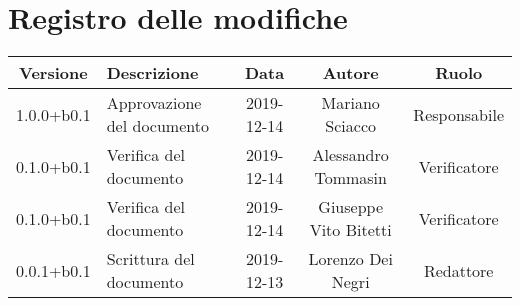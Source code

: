 \section*{Registro delle modifiche}

\begin{center}
	\begin{longtable}{|c|p{3cm}|c|c|c|}
	\hline
	\rowcolor{lighter-grayer}
	\textbf{Versione} & \textbf{Descrizione} & \textbf{Data} & \textbf{Autore} & \textbf{Ruolo} \\
	\hline
	\endfirsthead



	1.0.0+b0.1 & Approvazione del documento & 2019-12-14 & Mariano Sciacco & Responsabile \\
	\hline
	0.1.0+b0.1 & Verifica del documento & 2019-12-14 & Alessandro Tommasin & Verificatore \\
	\hline
	0.1.0+b0.1 & Verifica del documento & 2019-12-14 & Giuseppe Vito Bitetti & Verificatore \\
	\hline
	0.0.1+b0.1 & Scrittura del documento & 2019-12-13 & Lorenzo Dei Negri & Redattore \\
	\hline

	\end{longtable}
\end{center}
